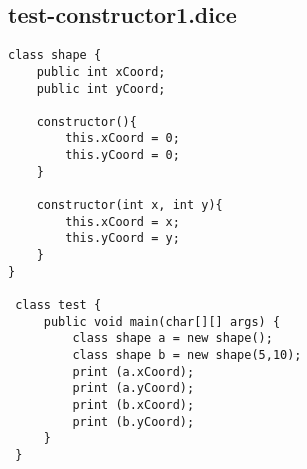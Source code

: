 \subsection{test-constructor1.dice}
\begin{verbatim}
class shape {
	public int xCoord;
	public int yCoord;
	
	constructor(){
		this.xCoord = 0;
		this.yCoord = 0;
	}

	constructor(int x, int y){
		this.xCoord = x;
		this.yCoord = y;
	}
}

 class test {
	 public void main(char[][] args) {
		 class shape a = new shape();
		 class shape b = new shape(5,10);
		 print (a.xCoord);
		 print (a.yCoord);
		 print (b.xCoord);
		 print (b.yCoord);
	 }
 }
\end{verbatim}